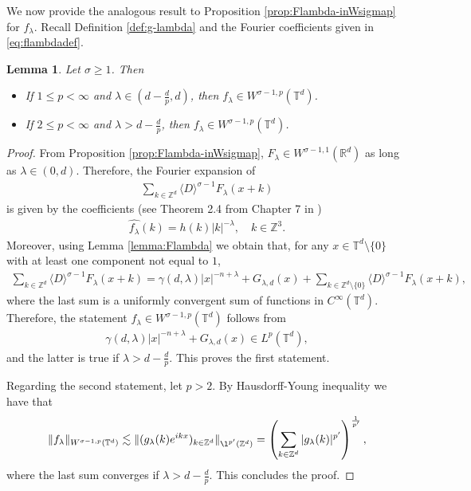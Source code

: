 \documentclass[a4paper, reqno, 11pt]{amsart}
\newtheorem{lemma}[theorem]{Lemma}
\theoremstyle{definition}
\begin{document}
We now provide the analogous result to Proposition \ref{prop:Flambda-inWsigmap} for $f_{\lambda}$. Recall  Definition \ref{def:g-lambda} and the Fourier coefficients given in \eqref{eq:flambdadef}.
\begin{lemma}\label{lemma:flambda-wsigmap-per}
Let $\sigma \geq 1$. Then
\begin{itemize}
\item If $1 \leq p < \infty$ and $\lambda \in (d - \frac{d}{p},d)$, then $f_{\lambda} \in W^{\sigma-1,p}(\mathbb{T}^d)$.
\item If $2 \leq p < \infty$ and $\lambda > d - \frac{d}{p}$, then $f_{\lambda} \in W^{\sigma-1,p}(\mathbb{T}^d)$.
\end{itemize}
\end{lemma}
\begin{proof}
From Proposition \ref{prop:Flambda-inWsigmap}, $F_{\lambda} \in W^{\sigma-1,1}(\mathbb{R}^d)$ as long as $\lambda \in (0,d)$. Therefore, the Fourier expansion of 
\begin{align*}
\sum_{k \in \mathbb{Z}^d} \langle D \rangle^{\sigma - 1} F_{\lambda}(x+k)
\end{align*}
is given by the coefficients (see Theorem 2.4 from Chapter 7 in \cite{steinweiss})
\begin{align*}
\widehat{f_{\lambda}}(k) =  h(k) |k|^{-\lambda}, \quad k \in \mathbb{Z}^3.
\end{align*}	
Moreover, using Lemma \ref{lemma:Flambda} we obtain that, for any $x \in \mathbb{T}^d \setminus \{0\}$ with at least one component not equal to $1$,
\begin{align*}
\sum_{k \in \mathbb{Z}^d} \langle D \rangle^{\sigma - 1} F_{\lambda}(x+k) = \gamma(d,\lambda) |x|^{-n+\lambda} + G_{\lambda,d}(x) + \sum_{k \in \mathbb{Z}^d \setminus \{0\}} \langle D \rangle^{\sigma - 1} F_{\lambda}(x+k),
\end{align*}
where the last sum is a uniformly convergent sum of functions in $C^{\infty}(\mathbb{T}^d)$. Therefore, the statement $f_{\lambda} \in W^{\sigma-1,p}(\mathbb{T}^d)$ follows from
\begin{align*}
\gamma(d,\lambda) |x|^{-n+\lambda} + G_{\lambda,d}(x) \in L^p(\mathbb{T}^d),
\end{align*}
and the latter is true if $\lambda > d - \frac{d}{p}$. This proves the first statement.

Regarding the second statement, let $p>2$. By Hausdorff-Young inequality we have that
\begin{align*}
\|f_{\lambda}\|_{W^{\sigma-1,p}(\mathbb{T}^d)} \lesssim \|(g_{\lambda}(k) e^{ikx})_{k \in \mathbb{Z}^d} \|_{\l^{p'}(\mathbb{Z}^d)} = \left( \sum_{k \in \mathbb{Z}^d} |g_{\lambda}(k)|^{p'} \right)^{\frac{1}{p'}},
\end{align*}
where the last sum converges if $\lambda > d - \frac{d}{p}$. This concludes the proof.
\end{proof}
\end{document}
